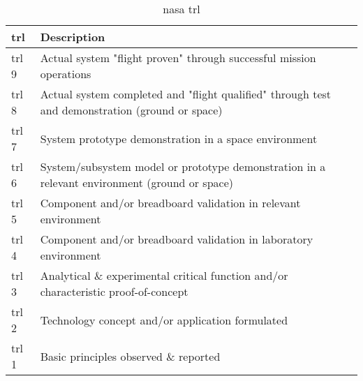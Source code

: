 \begin{table}[h]
	\caption[\acrshort{nasa} \acrlong{trl}]{\acrshort{nasa} \acrlong{trl} \cite{NASA2007}}
	\begin{tabular}{|p{}|p{}|}
		\hline
		\textbf{\acrfull{trl}} & \textbf{Description} \\ \hline \hline
		\gls{trl} 9& Actual system "flight proven" through successful mission operations\\
		\gls{trl} 8& Actual system completed and "flight qualified" through test and demonstration (ground or space)\\
		\gls{trl} 7& System prototype demonstration in a space environment\\
		\gls{trl} 6& System/subsystem model or prototype demonstration in a relevant environment (ground or space)\\
		\gls{trl} 5& Component and/or breadboard validation in relevant environment\\
		\gls{trl} 4& Component and/or breadboard validation in laboratory environment\\
		\gls{trl} 3& Analytical \& experimental critical function and/or characteristic proof-of-concept\\
		\gls{trl} 2& Technology concept and/or application formulated\\
		\gls{trl} 1& Basic principles observed \& reported \\
		\hline
	\end{tabular}
	\label{tab:trls}
\end{table}





